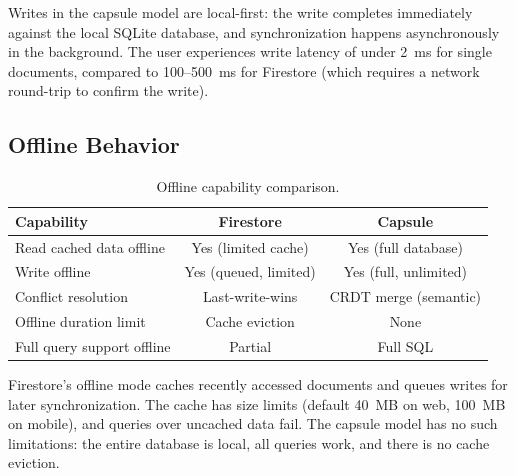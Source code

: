 Writes in the capsule model are local-first: the write completes
immediately against the local SQLite database, and synchronization
happens asynchronously in the background. The user experiences write
latency of under 2~ms for single documents, compared to 100--500~ms
for Firestore (which requires a network round-trip to confirm the write).

\subsection{Offline Behavior}

\begin{table}[H]
\centering
\caption{Offline capability comparison.}
\label{tab:offline}
\begin{tabular}{lcc}
\toprule
\textbf{Capability} & \textbf{Firestore} & \textbf{Capsule} \\
\midrule
Read cached data offline & Yes (limited cache) & Yes (full database) \\
Write offline & Yes (queued, limited) & Yes (full, unlimited) \\
Conflict resolution & Last-write-wins & CRDT merge (semantic) \\
Offline duration limit & Cache eviction & None \\
Full query support offline & Partial & Full SQL \\
\bottomrule
\end{tabular}
\end{table}

Firestore's offline mode caches recently accessed documents and queues
writes for later synchronization. The cache has size limits (default 40~MB
on web, 100~MB on mobile), and queries over uncached data fail. The
capsule model has no such limitations: the entire database is local,
all queries work, and there is no cache eviction.

